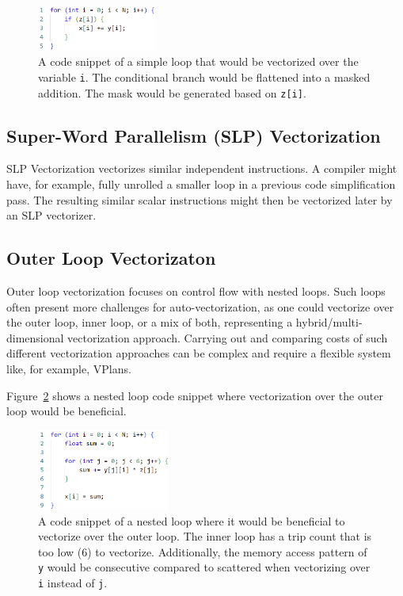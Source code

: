 \documentclass[sigplan,11pt,nonacm]{acmart}
\begin{document}
\begin{figure}
  \centering
  \includegraphics[width=0.35\textwidth]{images/inner-loop-vec.png}
  \caption{A code snippet of a simple loop that would be vectorized over the variable \texttt{i}. 
  The conditional branch would be flattened into a masked addition. The mask would be generated 
  based on \texttt{z[i]}.}
  \label{fig:inner-loop-vec}
\end{figure}

\subsection{Super-Word Parallelism (SLP) Vectorization}
SLP Vectorization vectorizes similar independent instructions. A compiler might have, for example, 
fully unrolled a smaller loop in a previous code simplification pass. The resulting similar scalar 
instructions might then be vectorized later by an SLP vectorizer.

\subsection{Outer Loop Vectorizaton}
Outer loop vectorization focuses on control flow with nested loops. Such loops often present
more challenges for auto-vectorization, as one could vectorize over the outer loop,
inner loop, or a mix of both, representing a hybrid/multi-dimensional vectorization approach. 
Carrying out and comparing costs of such different vectorization approaches can be complex 
and require a flexible system like, for example, VPlans. 

Figure~\ref{fig:outer-loop-vec} shows a nested loop code snippet where vectorization over the
outer loop would be beneficial.

\begin{figure}
  \centering
  \includegraphics[width=0.39\textwidth]{images/outer-loop-vec.png}
  \caption{A code snippet of a nested loop where it would be beneficial to vectorize over the 
  outer loop. The inner loop has a trip count that is too low (6) to vectorize. Additionally,
  the memory access pattern of \texttt{y} would be consecutive compared to scattered when
  vectorizing over \texttt{i} instead of \texttt{j}.}
  \label{fig:outer-loop-vec}
\end{figure}
\end{document}
